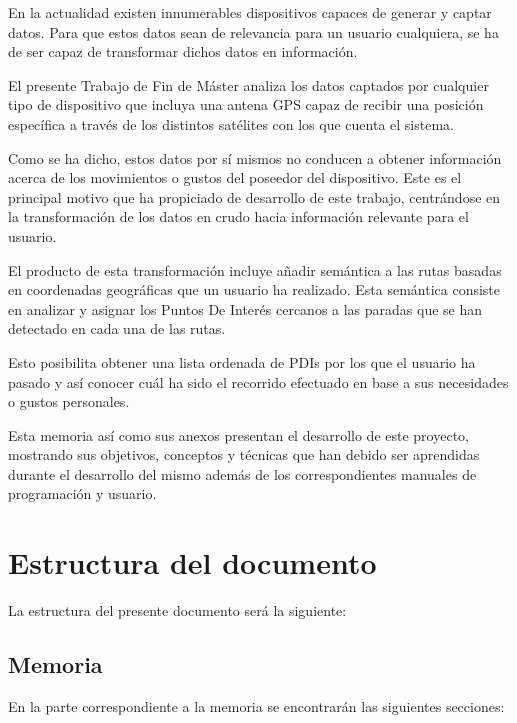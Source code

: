 
En la actualidad existen innumerables dispositivos capaces de generar y captar datos. Para que estos datos sean de relevancia para un usuario cualquiera, se ha de ser capaz de transformar dichos datos en información.

El presente Trabajo de Fin de Máster analiza los datos captados por cualquier tipo de dispositivo que incluya una antena GPS capaz de recibir una posición específica a través de los distintos satélites con los que cuenta el sistema.

Como se ha dicho, estos datos por sí mismos no conducen a obtener información acerca de los movimientos o gustos del poseedor del dispositivo. Este es el principal motivo que ha propiciado de desarrollo de este trabajo, centrándose en la transformación de los datos en crudo hacia información relevante para el usuario.

El producto de esta transformación incluye añadir semántica a las rutas basadas en coordenadas geográficas que un usuario ha realizado. Esta semántica consiste en analizar y asignar los Puntos De Interés cercanos a las paradas que se han detectado en cada una de las rutas.

Esto posibilita obtener una lista ordenada de PDIs por los que el usuario ha pasado y así conocer cuál ha sido el recorrido efectuado en base a sus necesidades o gustos personales.

Esta memoria así como sus anexos presentan el desarrollo de este proyecto, mostrando sus objetivos, conceptos y técnicas que han debido ser aprendidas durante el desarrollo del mismo además de los correspondientes manuales de programación y usuario.

\section{Estructura del documento}

La estructura del presente documento será la siguiente:

\subsection{Memoria}

En la parte correspondiente a la memoria se encontrarán las siguientes secciones:

